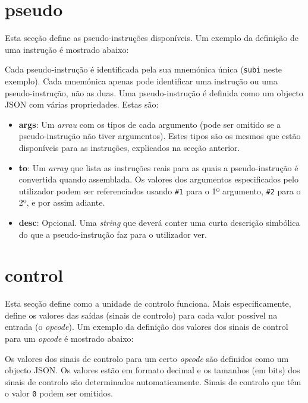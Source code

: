 \documentclass[11pt,a4paper,twoside,titlepage]{report}
\begin{document}
\section{pseudo}

Esta secção define as pseudo-instruções disponíveis.
Um exemplo da definição de uma instrução é mostrado abaixo:



Cada pseudo-instrução é identificada pela sua mnemónica única (\verb+subi+
neste exemplo). Cada mnemónica apenas pode identificar uma instrução ou uma
pseudo-instrução, não as duas.
Uma pseudo-instrução é definida como um objecto JSON com várias propriedades.
Estas são:

\begin{itemize}
	\item \textbf{args}: Um \emph{arrau} com os tipos de cada argumento (pode ser
		omitido se a pseudo-instrução não tiver argumentos). Estes tipos são os
		mesmos que estão disponíveis para as instruções, explicados na secção
		anterior.
	\item \textbf{to}: Um \emph{array} que lista as instruções reais para as quais
		a pseudo-instrução é convertida quando assemblada. Os valores dos argumentos
		especificados pelo utilizador podem ser referenciados usando \verb+#1+ para
		o 1º argumento, \verb+#2+ para o 2º, e por assim adiante.
	\item \textbf{desc}: Opcional. Uma \emph{string} que deverá conter uma
		curta descrição simbólica do que a pseudo-instrução faz para o utilizador 
		ver.
\end{itemize}


\section{control}

Esta secção define como a unidade de controlo funciona. Mais especificamente,
define os valores das saídas (sinais de controlo) para cada valor possível na
entrada (o \emph{opcode}).
Um exemplo da definição dos valores dos sinais de control para um \emph{opcode}
é mostrado abaixo:



Os valores dos sinais de controlo para um certo \emph{opcode} são definidos como
um objecto JSON. Os valores estão em formato decimal e os tamanhos (em bits) dos
sinais de controlo são determinados automaticamente.
Sinais de controlo que têm o valor \verb+0+ podem ser omitidos.
\end{document}
